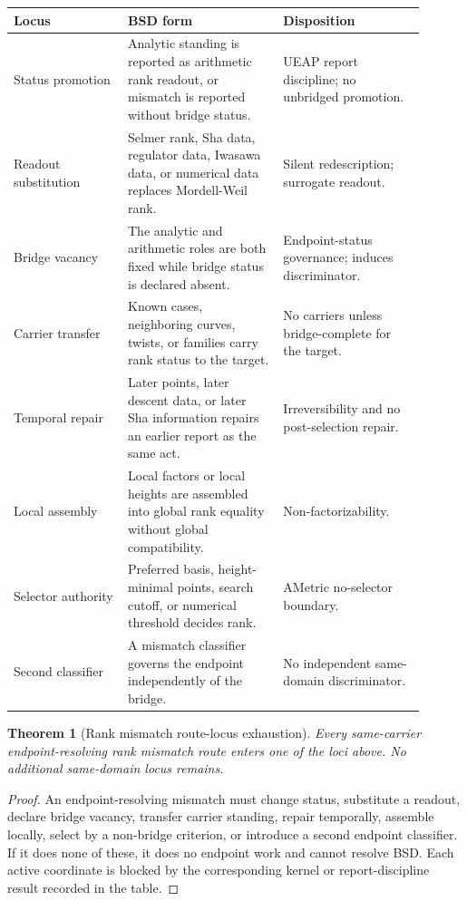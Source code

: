 \documentclass[11pt]{article}
\newtheorem{theorem}{Theorem}[section]
\begin{document}
\begin{longtable}{L{0.25\linewidth}L{0.34\linewidth}L{0.31\linewidth}}
\toprule
\textbf{Locus} & \textbf{BSD form} & \textbf{Disposition}\\
\midrule
Status promotion & Analytic standing is reported as arithmetic rank readout, or mismatch is reported without bridge status. & UEAP report discipline; no unbridged promotion.\\
Readout substitution & Selmer rank, Sha data, regulator data, Iwasawa data, or numerical data replaces Mordell-Weil rank. & Silent redescription; surrogate readout.\\
Bridge vacancy & The analytic and arithmetic roles are both fixed while bridge status is declared absent. & Endpoint-status governance; induces discriminator.\\
Carrier transfer & Known cases, neighboring curves, twists, or families carry rank status to the target. & No carriers unless bridge-complete for the target.\\
Temporal repair & Later points, later descent data, or later Sha information repairs an earlier report as the same act. & Irreversibility and no post-selection repair.\\
Local assembly & Local factors or local heights are assembled into global rank equality without global compatibility. & Non-factorizability.\\
Selector authority & Preferred basis, height-minimal points, search cutoff, or numerical threshold decides rank. & AMetric no-selector boundary.\\
Second classifier & A mismatch classifier governs the endpoint independently of the bridge. & No independent same-domain discriminator.\\
\bottomrule
\end{longtable}

\begin{theorem}[Rank mismatch route-locus exhaustion]
Every same-carrier endpoint-resolving rank mismatch route enters one of the loci above. No additional same-domain locus remains.
\end{theorem}

\begin{proof}
An endpoint-resolving mismatch must change status, substitute a readout, declare bridge vacancy, transfer carrier standing, repair temporally, assemble locally, select by a non-bridge criterion, or introduce a second endpoint classifier. If it does none of these, it does no endpoint work and cannot resolve BSD. Each active coordinate is blocked by the corresponding kernel or report-discipline result recorded in the table.
\end{proof}
\end{document}

